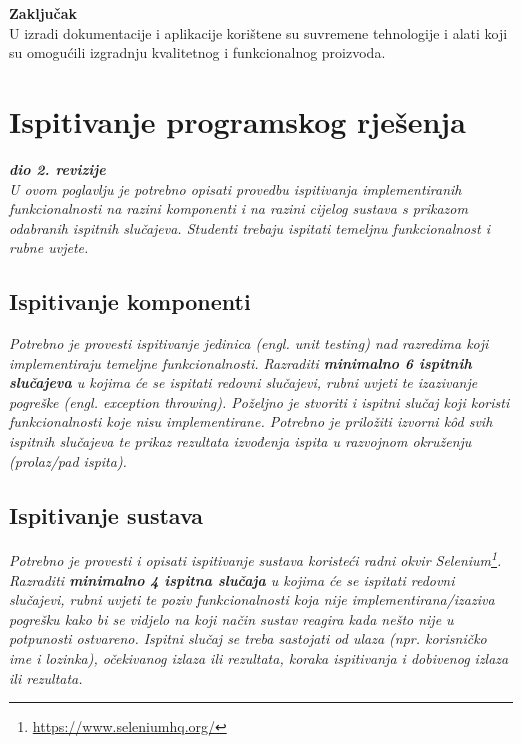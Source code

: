			\textbf{Zaključak}\\
			U izradi dokumentacije i aplikacije korištene su suvremene tehnologije i alati koji su omogućili izgradnju kvalitetnog i funkcionalnog proizvoda.
			
			
		
	
		\section{Ispitivanje programskog rješenja}
			
			\textbf{\textit{dio 2. revizije}}\\
			
			 \textit{U ovom poglavlju je potrebno opisati provedbu ispitivanja implementiranih funkcionalnosti na razini komponenti i na razini cijelog sustava s prikazom odabranih ispitnih slučajeva. Studenti trebaju ispitati temeljnu funkcionalnost i rubne uvjete.}
	
			
			\subsection{Ispitivanje komponenti}
			\textit{Potrebno je provesti ispitivanje jedinica (engl. unit testing) nad razredima koji implementiraju temeljne funkcionalnosti. Razraditi \textbf{minimalno 6 ispitnih slučajeva} u kojima će se ispitati redovni slučajevi, rubni uvjeti te izazivanje pogreške (engl. exception throwing). Poželjno je stvoriti i ispitni slučaj koji koristi funkcionalnosti koje nisu implementirane. Potrebno je priložiti izvorni kôd svih ispitnih slučajeva te prikaz rezultata izvođenja ispita u razvojnom okruženju (prolaz/pad ispita). }
			
			
			
			\subsection{Ispitivanje sustava}
			
			 \textit{Potrebno je provesti i opisati ispitivanje sustava koristeći radni okvir Selenium\footnote{\url{https://www.seleniumhq.org/}}. Razraditi \textbf{minimalno 4 ispitna slučaja} u kojima će se ispitati redovni slučajevi, rubni uvjeti te poziv funkcionalnosti koja nije implementirana/izaziva pogrešku kako bi se vidjelo na koji način sustav reagira kada nešto nije u potpunosti ostvareno. Ispitni slučaj se treba sastojati od ulaza (npr. korisničko ime i lozinka), očekivanog izlaza ili rezultata, koraka ispitivanja i dobivenog izlaza ili rezultata.\\ }
			 
